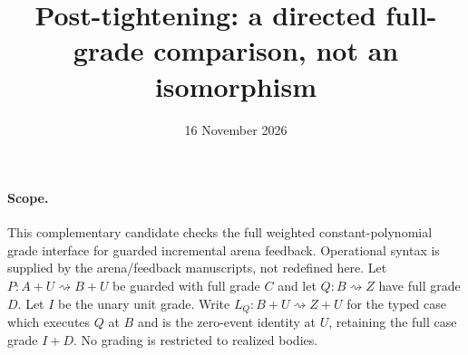 \documentclass{article}
\title{Post-tightening: a directed full-grade comparison, not an isomorphism}
\date{16 November 2026}
\begin{document}
\maketitle
\paragraph{Scope.}
This complementary candidate checks the full weighted constant-polynomial
grade interface for guarded incremental arena feedback. Operational syntax
is supplied by the arena/feedback manuscripts, not redefined here. Let
$P:A+U\rightsquigarrow B+U$ be guarded with full grade $C$ and let
$Q:B\rightsquigarrow Z$ have full grade $D$. Let $I$ be the unary unit
grade. Write $L_Q:B+U\rightsquigarrow Z+U$ for the typed case which executes
$Q$ at $B$ and is the zero-event identity at $U$, retaining the full case
grade $I+D$. No grading is restricted to realized bodies.
\end{document}
